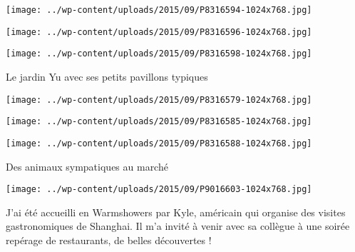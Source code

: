  

 

\begin{center} \texttt{[image: ../wp-content/uploads/2015/09/P8316594-1024x768.jpg]} \end{center}

 

 

\begin{center} \texttt{[image: ../wp-content/uploads/2015/09/P8316596-1024x768.jpg]} \end{center}

 

 

\begin{center} \texttt{[image: ../wp-content/uploads/2015/09/P8316598-1024x768.jpg]} \end{center}

 

 Le jardin Yu avec ses petits pavillons typiques 

 

\begin{center} \texttt{[image: ../wp-content/uploads/2015/09/P8316579-1024x768.jpg]} \end{center}

 

 

\begin{center} \texttt{[image: ../wp-content/uploads/2015/09/P8316585-1024x768.jpg]} \end{center}

 

 

\begin{center} \texttt{[image: ../wp-content/uploads/2015/09/P8316588-1024x768.jpg]} \end{center}

 

 Des animaux sympatiques au marché 

 

\begin{center} \texttt{[image: ../wp-content/uploads/2015/09/P9016603-1024x768.jpg]} \end{center}

 

 J'ai été accueilli en Warmshowers par Kyle, américain qui organise des visites gastronomiques de Shanghai. Il m'a invité à venir avec sa collègue à une soirée repérage de restaurants, de belles découvertes ! 

